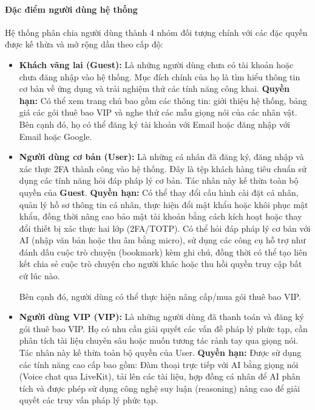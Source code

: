 \paragraph{Đặc điểm người dùng hệ thống}

Hệ thống phân chia người dùng
thành 4 nhóm đối tượng chính
với các đặc quyền được kế thừa
và mở rộng dần theo cấp độ:

\begin{itemize}

\item \textbf{Khách vãng lai (Guest):}
Là những người dùng chưa có tài khoản
hoặc chưa đăng nhập vào hệ thống.
Mục đích chính của họ
là tìm hiểu thông tin cơ bản về ứng dụng
và trải nghiệm thử các tính năng công khai.
\textbf{Quyền hạn:}
Có thể xem trang chủ bao gồm các thông tin:
giới thiệu hệ thống, bảng giá các gói thuê bao VIP
và nghe thử các mẫu giọng nói của các nhân vật.
Bên cạnh đó, họ có thể đăng ký tài khoản với Email
hoặc đăng nhập với Email hoặc Google.




\item \textbf{Người dùng cơ bản (User):}
Là những cá nhân đã đăng ký, đăng nhập
và xác thực 2FA
thành công vào hệ thống.
Đây là tệp khách hàng tiêu chuẩn
sử dụng các tính năng
hỏi đáp pháp lý cơ bản.
Tác nhân này kế thừa toàn bộ quyền của \textbf{Guest}.
\textbf{Quyền hạn:}
Có thể
thay đổi cấu hình cài đặt cá nhân,
quản lý hồ sơ thông tin cá nhân,
thực hiện đổi mật khẩu hoặc khôi phục mật khẩu,
đồng thời nâng cao bảo mật tài khoản bằng cách kích hoạt hoặc thay đổi thiết bị xác thực hai lớp (2FA/TOTP).
Có thể hỏi đáp pháp lý cơ bản với AI (nhập văn bản hoặc thu âm bằng micro),
sử dụng các công cụ hỗ trợ như đánh dấu cuộc trò chuyện (bookmark) kèm ghi chú, đồng thời có thể tạo liên kết chia sẻ cuộc trò chuyện cho người khác hoặc thu hồi quyền truy cập bất cứ lúc nào.





Bên cạnh đó, người dùng có thể thực hiện nâng cấp/mua gói thuê bao VIP.


\item \textbf{Người dùng VIP (VIP):}
Là những người dùng đã thanh toán
và đăng ký gói thuê bao VIP.
Họ có nhu cầu giải quyết
các vấn đề pháp lý phức tạp,
cần phân tích tài liệu chuyên sâu
hoặc muốn tương tác rảnh tay qua giọng nói.
Tác nhân này kế thừa toàn bộ quyền của User.
\textbf{Quyền hạn:}
Được sử dụng các tính năng cao cấp bao gồm:
Đàm thoại trực tiếp với AI bằng giọng nói
(Voice chat qua LiveKit),
tải lên các tài liệu, hợp đồng cá nhân để AI phân tích
và được phép sử dụng công nghệ suy luận (reasoning) nâng cao
để giải quyết các truy vấn pháp lý phức tạp.



\end{itemize}
